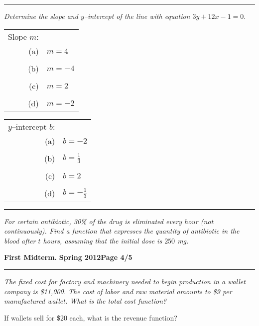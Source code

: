 \documentclass[12pt]{article}
\begin{document}
\vspace{2cm}
\hrule
{\problem[10 pts] \em Determine the slope and $y$--intercept of the
  line with equation $3y+12x-1=0.$}
\begin{tabular}{rl}
Slope $m$: \\
(a) & $m=4$ \\ \\
(b) & $m=-4$ \\ \\
(c) &$m=2$ \\ \\
(d) &$m=-2$
\end{tabular} \hspace{3cm}
\begin{tabular}{rl}
$y$--intercept $b$: \\
(a) & $b=-2$ \\ \\
(b) &$b=\tfrac{1}{3}$ \\ \\
(c) &$b=2$ \\ \\
(d) &$b=-\tfrac{1}{3}$
\end{tabular}
\vspace{3.5cm}
\hrule
{\problem[10 pts] \em For certain antibiotic, 30\% of the drug is
  eliminated every hour (not continuously).  Find a function that expresses the
quantity of antibiotic in the blood after $t$ hours, assuming that the initial
dose is $250$ mg.}
\vspace{3.5cm}
\begin{flushright}
\end{flushright}
\newpage

\hfill{\large\bf First Midterm.}\hfill{\large\bf
  Spring 2012}\hfill{\large\bf Page 4/5}\hrule

\bigskip
{\problem[15 pts] \em The fixed cost for factory and machinery needed
  to begin production in a wallet company is \$11,000.  The cost of
  labor and raw material amounts to \$9 per manufactured wallet.
  What is the total cost function?}
\vspace{1cm}

\begin{flushright}
\end{flushright}
\noindent
If wallets sell for \$20 each, what is the revenue function?
\vspace{1cm}
\end{document}
